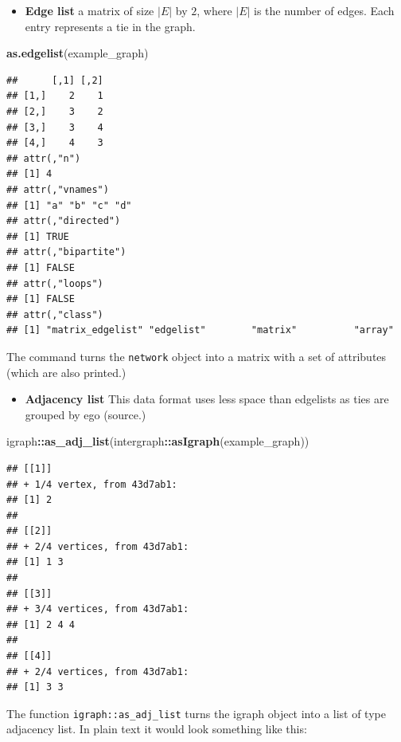 \documentclass[]{book}
\newenvironment{Shaded}{\begin{snugshade}}{\end{snugshade}}
\newcommand{\KeywordTok}[1]{\textcolor[rgb]{0.13,0.29,0.53}{\textbf{#1}}}
\newcommand{\NormalTok}[1]{#1}
\newcommand{\OperatorTok}[1]{\textcolor[rgb]{0.81,0.36,0.00}{\textbf{#1}}}
\providecommand{\tightlist}{%
  \setlength{\itemsep}{0pt}\setlength{\parskip}{0pt}}
\begin{document}
\begin{itemize}
\tightlist
\item
  \textbf{Edge list} a matrix of size \(|E|\) by \(2\), where \(|E|\) is the number of edges.
  Each entry represents a tie in the graph.
\end{itemize}

\begin{Shaded}
\begin{Highlighting}[]
\KeywordTok{as.edgelist}\NormalTok{(example_graph)}
\end{Highlighting}
\end{Shaded}

\begin{verbatim}
##      [,1] [,2]
## [1,]    2    1
## [2,]    3    2
## [3,]    3    4
## [4,]    4    3
## attr(,"n")
## [1] 4
## attr(,"vnames")
## [1] "a" "b" "c" "d"
## attr(,"directed")
## [1] TRUE
## attr(,"bipartite")
## [1] FALSE
## attr(,"loops")
## [1] FALSE
## attr(,"class")
## [1] "matrix_edgelist" "edgelist"        "matrix"          "array"
\end{verbatim}

The command turns the \texttt{network} object into a matrix with a set of attributes
(which are also printed.)

\begin{itemize}
\tightlist
\item
  \textbf{Adjacency list} This data format uses less space than edgelists as ties are
  grouped by ego (source.)
\end{itemize}

\begin{Shaded}
\begin{Highlighting}[]
\NormalTok{igraph}\OperatorTok{::}\KeywordTok{as_adj_list}\NormalTok{(intergraph}\OperatorTok{::}\KeywordTok{asIgraph}\NormalTok{(example_graph)) }
\end{Highlighting}
\end{Shaded}

\begin{verbatim}
## [[1]]
## + 1/4 vertex, from 43d7ab1:
## [1] 2
## 
## [[2]]
## + 2/4 vertices, from 43d7ab1:
## [1] 1 3
## 
## [[3]]
## + 3/4 vertices, from 43d7ab1:
## [1] 2 4 4
## 
## [[4]]
## + 2/4 vertices, from 43d7ab1:
## [1] 3 3
\end{verbatim}

The function \texttt{igraph::as\_adj\_list} turns the igraph object into a list of
type adjacency list. In plain text it would look something like this:
\end{document}
